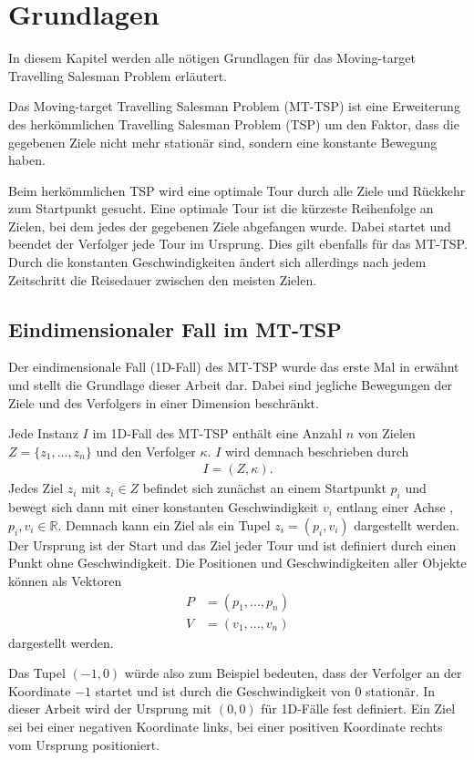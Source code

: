 \documentclass[german,version-2019-11]{uzl-thesis}
\begin{document}
\chapter{Grundlagen}
\label{kap2}
\label{chapter-use}
In diesem Kapitel werden alle nötigen Grundlagen für das Moving-target Travelling Salesman Problem erläutert. 
\begin{definition}
Das Moving-target Travelling Salesman Problem (MT-TSP) ist eine Erweiterung des herkömmlichen Travelling Salesman Problem (TSP) um den Faktor, dass die gegebenen Ziele nicht mehr stationär sind, sondern eine konstante Bewegung haben.
\end{definition}\noindent
Beim herkömmlichen TSP wird eine optimale Tour durch alle Ziele und Rückkehr zum Startpunkt gesucht. Eine optimale Tour ist die kürzeste Reihenfolge an Zielen, bei dem jedes der gegebenen Ziele abgefangen wurde. Dabei startet und beendet der Verfolger jede Tour im Ursprung. Dies gilt ebenfalls für das MT-TSP. Durch die konstanten Geschwindigkeiten ändert sich allerdings nach jedem Zeitschritt die Reisedauer zwischen den meisten Zielen.

\section{Eindimensionaler Fall im MT-TSP}
Der eindimensionale Fall (1D-Fall) des MT-TSP wurde das erste Mal in \cite{helvig} erwähnt und stellt die Grundlage dieser Arbeit dar. Dabei sind jegliche Bewegungen der Ziele und des Verfolgers in einer Dimension 
beschränkt.
\begin{definition} 
\label{def:Instanz}
Jede Instanz $I$ im 1D-Fall des MT-TSP enthält eine Anzahl $n$ von Zielen $Z = \{z_1,...,z_n\}$ und den Verfolger $\kappa$. $I$ wird demnach beschrieben durch
\begin{align*}
I = (Z, \kappa).
\end{align*}
Jedes Ziel $z_i$ mit $z_i\in Z$ befindet sich zunächst an einem Startpunkt $p_i$ und bewegt sich dann mit einer konstanten Geschwindigkeit $v_i$ entlang einer Achse , $p_i, v_i \in\mathbb{R}$. Demnach kann ein Ziel als ein Tupel $z_i = (p_i, v_i)$ dargestellt werden. Der Ursprung ist der Start und das Ziel jeder Tour und ist definiert durch einen Punkt ohne Geschwindigkeit. Die Positionen und Geschwindigkeiten aller Objekte können als Vektoren
\begin{align*}
P &= (p_1, ..., p_n)\\
V &= (v_1, ..., v_n)
\end{align*}\newpage\noindent
dargestellt werden.
\end{definition}\noindent
Das Tupel $(-1,0)$ würde also zum Beispiel bedeuten, dass der Verfolger an der Koordinate $-1$ startet und ist durch die Geschwindigkeit von $0$ stationär. In dieser Arbeit wird der Ursprung mit $(0,0)$ für 1D-Fälle fest definiert. Ein Ziel sei bei einer negativen Koordinate links, bei einer positiven Koordinate rechts vom Ursprung positioniert.
\end{document}
